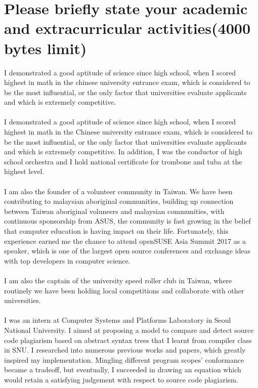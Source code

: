 \documentclass{article}
\begin{document}
 \section{Please briefly state your academic and extracurricular activities(4000 bytes limit)}
I demonstrated a good aptitude of science since high school, when I scored highest in math in the chinese university entrance exam, which is considered to be the most influential, or the only factor that universities evaluate applicants and which is extremely competitive. \\
\\
I demonstrated a good aptitude of science since high school, when I scored highest in math in the Chinese university entrance exam, which is considered to be the most influential, or the only factor that universities evaluate applicants and which is extremely competitive. In addition, I was the conductor of high school orchestra and I hold national certificate for trombone and tuba at the highest level. \\
\\
I am also the founder of a volunteer community in Taiwan. We have been contributing to malaysian aboriginal communities, building up connection between Taiwan aboriginal voluneers and malaysian communities, with continuous sponsorship from ASUS, the community is fast growing in the belief that computer education is having impact on their life. Fortunately, this experience earned me the chance to attend openSUSE Asia Summit 2017 as a speaker, which is one of the largest open source conferences and exchange ideas with top developers in computer science. \\
\\
I am also the captain of the university speed roller club in Taiwan, where routinely we have been holding local competitions and collaborate with other universities. \\
\\
I was an intern at Computer Systems and Platforms Laboratory in Seoul National University. I aimed at proposing a model to compare and detect source code plagiarism based on abstract syntax trees that I learnt from compiler class in SNU. I researched into numerous previous works and papers, which greatly inspired my implementation. Mingling different program scopes' conformance became a tradeoff, but eventually, I succeeded in drawing an equation which would retain a satisfying judgement with respect to source code plagiarism.\\
\\
\end{document}

